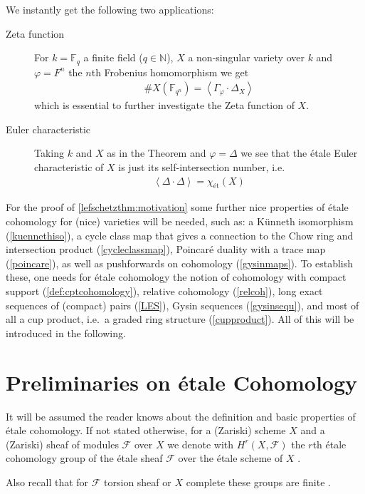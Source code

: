 \documentclass[english]{scrartcl}
\theoremstyle{definition}
\theoremstyle{remark}
\newcommand*{\N}{\mathds{N}}
\newcommand*{\fF}{\mathds{F}} %
\newcommand*{\F}{\mathcal{F}} %
\newcommand*{\idest}{i.e.\ }
\newcommand*{\forexample}{e.g.\ }
\newcommand*{\intProd}[2]{{#1\cdot#2}} %
\newcommand*{\intNum}[1]{{\left\langle{#1}\right\rangle}} %
\newcommand*{\Graph}[1]{{\Gamma_{#1}}} %
\newcommand*{\Diag}[1]{{\Delta_{#1}}} %
\renewcommand*{\phi}{\varphi}
\begin{document}
We instantly get the following two applications:
\begin{description}
\item[Zeta function] For
  $k=\fF_{q}$ a finite field ($q\in\N$),
  $X$ a non-singular variety over $k$ and
  $\phi=F^n$ the $n$th Frobenius homomorphism
  we get
  \begin{gather*}
    \#X(\fF_{q^n}) = \intNum{\intProd{\Graph\phi}{\Diag X}}
  \end{gather*}
  which is essential to further investigate the Zeta function of $X$.
\item[Euler characteristic] Taking $k$ and $X$ as in the Theorem and
  $\phi=\Delta$ we see that the étale Euler characteristic of $X$ is
  just its self-intersection number, \idest
  \begin{gather*}
    \intNum{\intProd{\Delta}{\Delta}} = \chi_{\text{ét}}(X)
  \end{gather*}
\end{description}

For the proof of \ref{lefschetzthm:motivation}
some further nice properties of étale cohomology for
(nice) varieties will be needed, such as:
a Künneth isomorphism (\autoref{kuennethiso}),
a cycle class map that gives a connection to the Chow ring and
intersection product (\autoref{cycleclassmap}),
Poincaré duality with a trace map (\autoref{poincare}),
as well as pushforwards on cohomology (\autoref{gysinmaps}).
To establish these, one needs for étale cohomology the notion of
cohomology with compact support (\autoref{def:cptcohomology}),
relative cohomology (\autoref{relcoh}),
long exact sequences of (compact) pairs (\autoref{LES}),
Gysin sequences (\autoref{gysinsequ}),
and most of all a cup product, \idest a graded ring structure
(\autoref{cupproduct}).
All of this will be introduced in the following.

\section{Preliminaries on étale Cohomology}
It will be assumed the reader knows about the definition and basic
properties of étale cohomology. If not stated otherwise, for a
(Zariski) scheme $X$ and a (Zariski) sheaf of modules $\F$ over $X$ we
denote with $H^r(X,\F)$ the $r$th étale cohomology group of the étale
sheaf $\F$ over the étale scheme of $X$
\cite[compare][Chap.~6, Examples of Sheaves on $X_\text{ét}$]{milne}.

Also recall that for $\F$ torsion sheaf or $X$ complete these groups
are finite \cite[\forexample][Thm.~19.1]{milne}.
\end{document}
